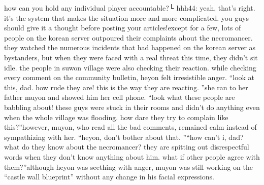  how can you hold any individual player accountable?└ hhh44: yeah, that’s right.
 it’s the system that makes the situation more and more complicated.
 you guys should give it a thought before posting your articles!except for a few, lots of people on the korean server outpoured their complaints about the necromancer.
they watched the numerous incidents that had happened on the korean server as bystanders, but when they were faced with a real threat this time, they didn’t sit idle.
the people in suwon village were also checking their reaction.
 while checking every comment on the community bulletin, heyon felt irresistible anger.
“look at this, dad.
 how rude they are! this is the way they are reacting.
”she ran to her father muyon and showed him her cell phone.
“look what these people are babbling about! these guys were stuck in their rooms and didn’t do anything even when the whole village was flooding.
 how dare they try to complain like this?”however, muyon, who read all the bad comments, remained calm instead of sympathizing with her.
“heyon, don’t bother about that.
”“how can’t i, dad? what do they know about the necromancer? they are spitting out disrespectful words when they don’t know anything about him.
 what if other people agree with them?”although heyon was seething with anger, muyon was still working on the “castle wall blueprint” without any change in his facial expressions.

